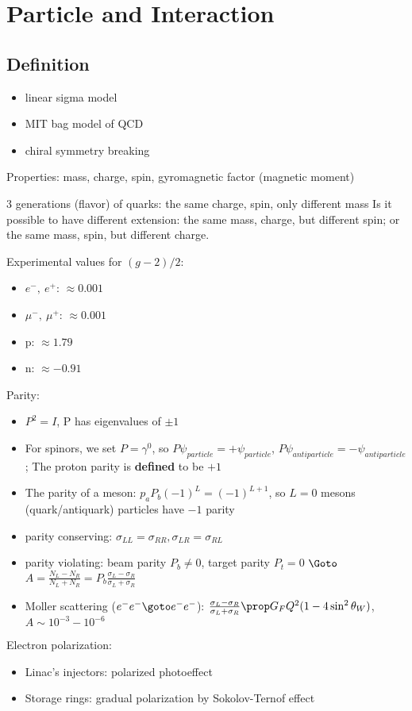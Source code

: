 \section{Particle and Interaction}
\subsection{Definition} 
\begin{itemize}
    \item linear sigma model
    \item MIT bag model of QCD
    \item chiral symmetry breaking
\end{itemize}
Properties: mass, charge, spin, gyromagnetic factor (magnetic moment)

3 generations (flavor) of quarks: the same charge, spin, only different mass
Is it possible to have different extension: the same mass, charge, but different spin; or the same mass, spin, but different charge.

Experimental values for $(g-2)/2$:
\begin{itemize}
    \item $e^-, \ e^+$: $\approx 0.001$
    \item $\mu^-, \ \mu^+$: $\approx 0.001$
    \item p: $\approx 1.79$
    \item n: $\approx -0.91$
\end{itemize}

Parity:
\begin{itemize}
    \item $P^2 = I$, P has eigenvalues of $\pm 1$
    \item For spinors, we set $P = \gamma^0$, so $P\psi_{particle} = +\psi_{particle}$, $P\psi_{antiparticle} = -\psi_{antiparticle}$;
    The proton parity is \textbf{defined} to be $+1$
\item The parity of a meson: $p_a P_b (-1)^{L} = (-1)^{L+1}$, so $L=0$ mesons (quark/antiquark) particles have $-1$ parity
    \item parity conserving: $\sigma_{LL} = \sigma_{RR}, \sigma_{LR} = \sigma_{RL}$
    \item parity violating: beam parity $P_b \ne 0$, target parity $P_t = 0$ $\Goto$ $A = \frac{N_L - N_R}{N_L + N_R} = P_b \frac{\sigma_L - \sigma_R}{\sigma_L + \sigma_R}$
    \item Moller scattering ($e^- e^- \goto e^- e^-$): $\frac{\sigma_L - \sigma_R}{\sigma_L + \sigma_R} \prop G_F Q^2 ( 1- 4\sin^2\theta_W)$, $A \sim 10^{-3} - 10^{-6}$
\end{itemize}

Electron polarization:
\begin{itemize}
    \item Linac's injectors: polarized photoeffect
    \item Storage rings: gradual polarization by Sokolov-Ternof effect
\end{itemize}
